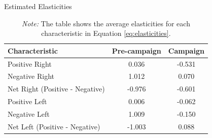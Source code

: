 \documentclass[12pt]{article}
\begin{document}

	
	
	
	\begin{table}[!htb]
		\centering
			\caption{Estimated Elasticities}
\begin{tabular}{lcc}
	\toprule
	Characteristic & \textbf{Pre-campaign}& \textbf{Campaign} \\
	\midrule
	Positive Right & 0.036 & -0.531 \\
	Negative Right & 1.012 & 0.070 \\
	Net Right (Positive - Negative) & -0.976 & -0.601 \\
	\hline
	Positive Left & 0.006 & -0.062 \\
	Negative Left & 1.009 & -0.150 \\
	Net Left (Positive - Negative) & -1.003 & 0.088 \\
	\bottomrule
\end{tabular}
	\caption*{\textit{Note:} \small The table shows the average elasticities for each characteristic in Equation \ref{eq:elasticities}. }
\label{tab:elasticities0}
	\end{table}
\end{document}
